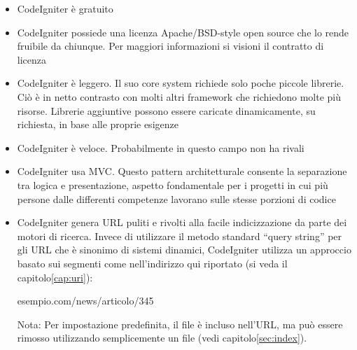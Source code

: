 \begin{itemize}
\item CodeIgniter è gratuito
\item CodeIgniter possiede una licenza Apache/BSD-style open source che lo rende fruibile da chiunque. Per maggiori informazioni si visioni il contratto di licenza
\item CodeIgniter è leggero. Il suo core system richiede solo poche piccole librerie. Ciò è in netto contrasto con molti altri framework che richiedono molte più risorse. Librerie aggiuntive possono essere caricate dinamicamente, su richiesta, in base alle proprie esigenze
\item CodeIgniter è veloce. Probabilmente in questo campo non ha rivali
\item CodeIgniter usa \ac{MVC}. Questo pattern architetturale consente la separazione tra logica e presentazione, aspetto fondamentale per i progetti in cui più persone dalle differenti competenze lavorano sulle stesse porzioni di codice
\item CodeIgniter genera \ac{URL} puliti e rivolti alla facile indicizzazione da parte dei motori di ricerca. Invece di utilizzare il metodo standard ``query string'' per gli \ac{URL} che è sinonimo di sistemi dinamici, CodeIgniter utilizza un approccio basato sui segmenti come nell'indirizzo qui riportato (si veda il capitolo\vref{cap:uri}):

\begin{code}
esempio.com/news/articolo/345
\end{code}

Nota: Per impostazione predefinita, il file  è incluso nell'\ac{URL}, ma può essere rimosso utilizzando semplicemente un file  (vedi capitolo\vref{sec:index}).


\end{itemize}
